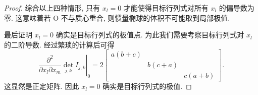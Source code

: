 \documentclass{article}
\begin{document}
\begin{proof}
综合以上四种情形, 只有 $x_l=0$ 才能使得目标行列式对所有 $x_l$ 的偏导数为零.
这意味着若 O 不与质心重合, 则惯量椭球的体积不可能取到局部极值.

最后证明 $x_l=0$ 确实是目标行列式的极值点.
为此我们需要考察目标行列式对 $x_l$ 的二阶导数.
经过繁琐的计算后可得
\begin{equation}
	\left.\frac{\partial^2}{\partial x_l\partial x_m}\det_{j,k}I_{j,k}\right|_0
	=2\left[\begin{matrix}a\left(b+c\right)\\&b\left(c+a\right)\\&&c\left(a+b\right)\end{matrix}\right].
\end{equation}
这显然是正定矩阵. 因此 $x_l=0$ 确实是目标行列式的极值.
\end{proof}
\end{document}
